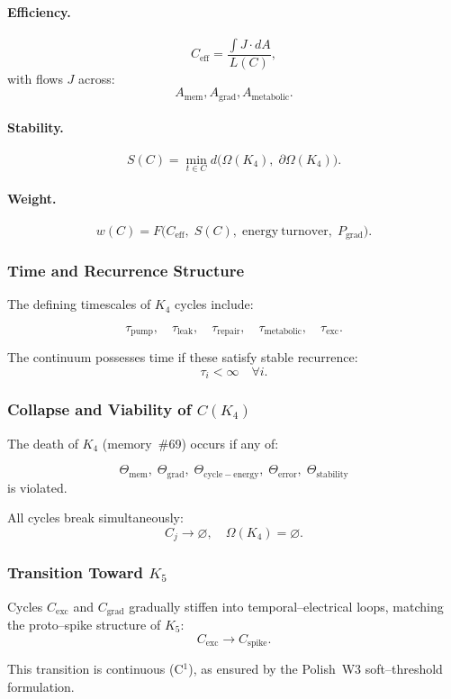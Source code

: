 \paragraph{Efficiency.}
\[
  C_{\mathrm{eff}}
    =\frac{\int J\cdot dA}{L(C)},
\]
with flows $J$ across:
\[
  A_{\mathrm{mem}}, A_{\mathrm{grad}}, A_{\mathrm{metabolic}}.
\]

\paragraph{Stability.}
\[
  S(C) 
   = \min_{t\in C}
       d\bigl(
         \Omega(K_4),\;
         \partial\Omega(K_4)
       \bigr).
\]

\paragraph{Weight.}
\[
  w(C)=F\bigl(
        C_{\mathrm{eff}},\;
        S(C),\;
        \mathrm{energy\ turnover},\;
        P_{\mathrm{grad}}
      \bigr).
\]

\subsubsection{Time and Recurrence Structure}

The defining timescales of $K_4$ cycles include:

\[
  \tau_{\mathrm{pump}},\quad
  \tau_{\mathrm{leak}},\quad
  \tau_{\mathrm{repair}},\quad
  \tau_{\mathrm{metabolic}},\quad
  \tau_{\mathrm{exc}}.
\]

The continuum possesses time if these satisfy stable recurrence:
\[
  \tau_i<\infty \quad\forall i.
\]

\subsubsection{Collapse and Viability of \texorpdfstring{$C(K_4)$}{C(K_4)}}

The death of $K_4$ (memory~\#69) occurs if any of:

\[
  \Theta_{\mathrm{mem}},\;
  \Theta_{\mathrm{grad}},\;
  \Theta_{\mathrm{cycle-energy}},\;
  \Theta_{\mathrm{error}},\;
  \Theta_{\mathrm{stability}}
\]
is violated.

All cycles break simultaneously:
\[
  C_j \to \varnothing,
\quad
  \Omega(K_4)=\varnothing.
\]

\subsubsection{Transition Toward \texorpdfstring{$K_5$}{K_5}}

Cycles $C_{\mathrm{exc}}$ and $C_{\mathrm{grad}}$ gradually 
stiffen into temporal–electrical loops, matching the 
proto–spike structure of $K_5$:
\[
  C_{\mathrm{exc}}\longrightarrow C_{\mathrm{spike}}.
\]

This transition is continuous (C$^1$), as ensured by 
the Polish~W3 soft–threshold formulation.

